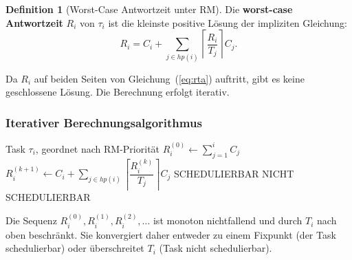 ﻿\documentclass[a4paper,12pt]{report}
\theoremstyle{definition}
\newtheorem{definition}{Definition}[chapter]
\begin{document}
\begin{definition}[Worst-Case Antwortzeit unter RM]
	Die \textbf{worst-case Antwortzeit} $R_i$ von $\tau_i$ ist die kleinste positive
	Lösung der impliziten Gleichung:
	\begin{equation}
		R_i = C_i + \sum_{j \in hp(i)} \left\lceil \frac{R_i}{T_j} \right\rceil C_j.
		\label{eq:rta}
	\end{equation}
\end{definition}

Da $R_i$ auf beiden Seiten von Gleichung~(\ref{eq:rta}) auftritt, gibt es keine
geschlossene Lösung. Die Berechnung erfolgt iterativ.

\subsubsection{Iterativer Berechnungsalgorithmus}

\begin{algorithmic}[1]
	\Require Task $\tau_i$, geordnet nach RM-Priorität
	\State $R_i^{(0)} \leftarrow \sum_{j=1}^{i} C_j$ 
	\Repeat
	\State $R_i^{(k+1)} \leftarrow C_i + \sum_{j \in hp(i)} \left\lceil \dfrac{R_i^{(k)}}{T_j} \right\rceil C_j$
	\State \Return SCHEDULIERBAR
	\Else
	\State \Return NICHT SCHEDULIERBAR
	\EndIf
\end{algorithmic}

Die Sequenz $R_i^{(0)}, R_i^{(1)}, R_i^{(2)}, \ldots$ ist monoton nichtfallend und
durch $T_i$ nach oben beschränkt. Sie konvergiert daher entweder zu einem Fixpunkt
(der Task schedulierbar) oder überschreitet $T_i$ (Task nicht schedulierbar).
\end{document}
